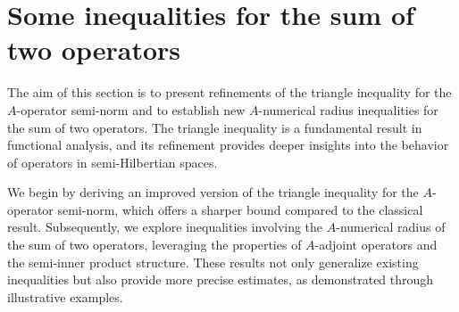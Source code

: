 \documentclass{article}
\begin{document}
\section{ Some inequalities for the sum of two operators}
The aim of this section is to present refinements of the triangle inequality for the $A$-operator semi-norm and to establish new $A$-numerical radius inequalities for the sum of two operators. The triangle inequality is a fundamental result in functional analysis, and its refinement provides deeper insights into the behavior of operators in semi-Hilbertian spaces.

We begin by deriving an improved version of the triangle inequality for the $A$-operator semi-norm, which offers a sharper bound compared to the classical result. Subsequently, we explore inequalities involving the $A$-numerical radius of the sum of two operators, leveraging the properties of $A$-adjoint operators and the semi-inner product structure. These results not only generalize existing inequalities but also provide more precise estimates, as demonstrated through illustrative examples.
\end{document}
